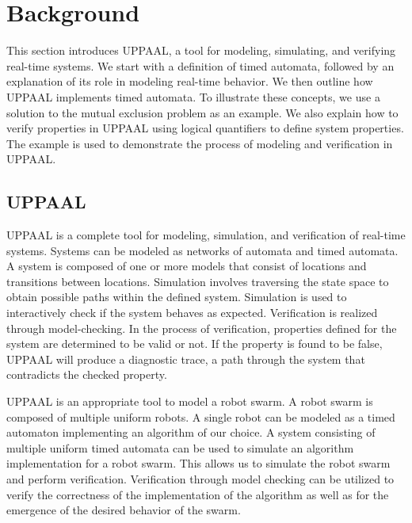 \section{Background}
This section introduces UPPAAL, a tool for modeling, simulating, and verifying real-time systems. We start with a definition of timed automata, followed by an explanation of its role in modeling real-time behavior. We then outline how UPPAAL implements timed automata. To illustrate these concepts, we use a solution to the mutual exclusion problem as an example. We also explain how to verify properties in UPPAAL using logical quantifiers to define system properties. The example is used to demonstrate the process of modeling and verification in UPPAAL.

\subsection{UPPAAL}
UPPAAL \cite{Larsen1997} is a complete tool for modeling, simulation, and verification of real-time systems. Systems can be modeled as networks of automata and timed automata. A system is composed of one or more models that consist of locations and transitions between locations. Simulation involves traversing the state space to obtain possible paths within the defined system. Simulation is used to interactively check if the system behaves as expected. Verification is realized through model-checking. In the process of verification, properties defined for the system are determined to be valid or not. If the property is found to be false, UPPAAL will produce a diagnostic trace, a path through the system that contradicts the checked property. 

UPPAAL is an appropriate tool to model a robot swarm. A robot swarm is composed of multiple uniform robots. A single robot can be modeled as a timed automaton implementing an algorithm of our choice. A system consisting of multiple uniform timed automata can be used to simulate an algorithm implementation for a robot swarm. This allows us to simulate the robot swarm and perform verification. Verification through model checking can be utilized to verify the correctness of the implementation of the algorithm as well as for the emergence of the desired behavior of the swarm.


